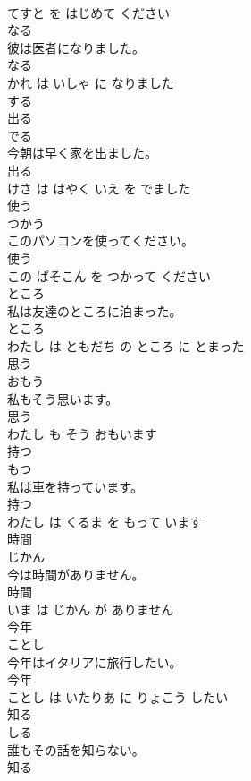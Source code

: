 \documentclass[8pt]{extreport}
\begin{document}
\begin{CJK}{UTF8}{min}
\\	てすと を はじめて ください			
\\	なる	
\\	彼は医者になりました。	
\\	なる 
\\	かれ は いしゃ に なりました			
\\	する	
\\	出る	
\\	でる			
\\	今朝は早く家を出ました。	
\\	出る 
\\	けさ は はやく いえ を でました			
\\	使う	
\\	つかう			
\\	このパソコンを使ってください。	
\\	使う 
\\	この ぱそこん を つかって ください			
\\	ところ	
\\	私は友達のところに泊まった。	
\\	ところ 
\\	わたし は ともだち の ところ に とまった			
\\	思う	
\\	おもう			
\\	私もそう思います。	
\\	思う 
\\	わたし も そう おもいます			
\\	持つ	
\\	もつ			
\\	私は車を持っています。	
\\	持つ 
\\	わたし は くるま を もって います			
\\	時間	
\\	じかん			
\\	今は時間がありません。	
\\	時間 
\\	いま は じかん が ありません			
\\	今年	
\\	ことし			
\\	今年はイタリアに旅行したい。	
\\	今年 
\\	ことし は いたりあ に りょこう したい			
\\	知る	
\\	しる			
\\	誰もその話を知らない。	
\\	知る 

\end{CJK}
\end{document}
